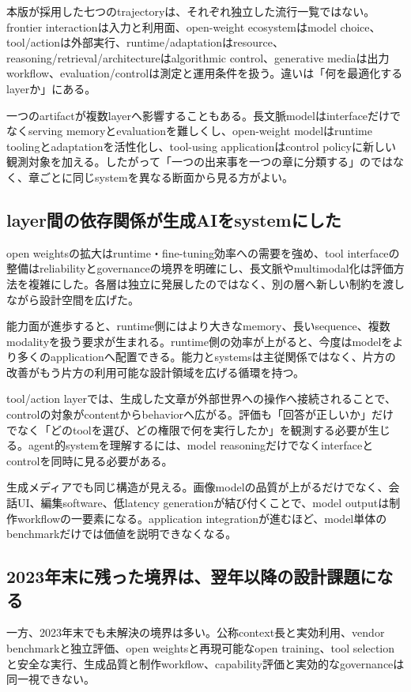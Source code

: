 本版が採用した七つのtrajectoryは、それぞれ独立した流行一覧ではない。frontier interactionは入力と利用面、open-weight ecosystemはmodel choice、tool/actionは外部実行、runtime/adaptationはresource、reasoning/retrieval/architectureはalgorithmic control、generative mediaは出力workflow、evaluation/controlは測定と運用条件を扱う。違いは「何を最適化するlayerか」にある。


一つのartifactが複数layerへ影響することもある。長文脈modelはinterfaceだけでなくserving memoryとevaluationを難しくし、open-weight modelはruntime toolingとadaptationを活性化し、tool-using applicationはcontrol policyに新しい観測対象を加える。したがって「一つの出来事を一つの章に分類する」のではなく、章ごとに同じsystemを異なる断面から見る方がよい。


\subsection{layer間の依存関係が生成AIをsystemにした}

open weightsの拡大はruntime・fine-tuning効率への需要を強め、tool interfaceの整備はreliabilityとgovernanceの境界を明確にし、長文脈やmultimodal化は評価方法を複雑にした。各層は独立に発展したのではなく、別の層へ新しい制約を渡しながら設計空間を広げた。


能力面が進歩すると、runtime側にはより大きなmemory、長いsequence、複数modalityを扱う要求が生まれる。runtime側の効率が上がると、今度はmodelをより多くのapplicationへ配置できる。能力とsystemsは主従関係ではなく、片方の改善がもう片方の利用可能な設計領域を広げる循環を持つ。


tool/action layerでは、生成した文章が外部世界への操作へ接続されることで、controlの対象がcontentからbehaviorへ広がる。評価も「回答が正しいか」だけでなく「どのtoolを選び、どの権限で何を実行したか」を観測する必要が生じる。agent的systemを理解するには、model reasoningだけでなくinterfaceとcontrolを同時に見る必要がある。


生成メディアでも同じ構造が見える。画像modelの品質が上がるだけでなく、会話UI、編集software、低latency generationが結び付くことで、model outputは制作workflowの一要素になる。application integrationが進むほど、model単体のbenchmarkだけでは価値を説明できなくなる。


\subsection{2023年末に残った境界は、翌年以降の設計課題になる}

一方、2023年末でも未解決の境界は多い。公称context長と実効利用、vendor benchmarkと独立評価、open weightsと再現可能なopen training、tool selectionと安全な実行、生成品質と制作workflow、capability評価と実効的なgovernanceは同一視できない。


